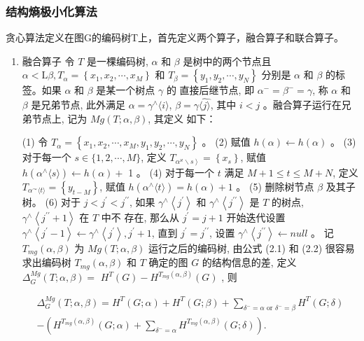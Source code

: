 \documentclass[a4paper]{apa6}
\begin{document}
\subsubsection{结构熵极小化算法}
\label{sec:orgdf1ffb0}
贪心算法定义在图G的编码树T上，首先定义两个算子，融合算子和联合算子。

\begin{enumerate}
\item 融合算子
\label{sec:org3344f46}
令 \(T\) 是一棵编码树, \(\alpha\) 和 \(\beta\) 是树中的两个节点且 \(\alpha<\mathrm{L} \beta, T_{\alpha}=\left\{x_{1}, x_{2}, \cdots, x_{M}\right\}\) 和 \(T_{\beta}=\left\{y_{1}, y_{2}, \cdots, y_{N}\right\}\) 分别是 \(\alpha\) 和 \(\beta\) 的标签。如果 \(\alpha\) 和 \(\beta\) 是某一个树点 \(\gamma\) 的 直接后继节点, 即 \(\alpha^{-}=\beta^{-}=\gamma\), 称 \(\alpha\) 和 \(\beta\) 是兄弟节点, 此外满足 \(\alpha=\gamma^{\wedge}\langle i\rangle\), \(\beta=\gamma \hat{\langle j\rangle}\), 其中 \(i<j\) 。融合算子运行在兄弟节点上, 记为 \(M g(T ; \alpha, \beta)\), 其定义 如下：

(1) 令 \(T_{\alpha}=\left\{x_{1}, x_{2}, \cdots, x_{M}, y_{1}, y_{2}, \cdots, y_{N}\right\}\) 。
(2) 赋值 \(h(\alpha) \leftarrow h(\alpha)\) 。
(3) 对于每一个 \(s \in\{1,2, \cdots, M\}\), 定义 \(T_{\left.\alpha^{\varkappa} \backslash s\right\rangle}=\left\{x_{s}\right\}\), 赋值 \(h\left(\alpha^{\wedge}\langle s\rangle\right) \leftarrow h(\alpha)+\)
1 。
(4) 对于每一个 \(t\) 满足 \(M+1 \leq t \leq M+N\), 定义 \(T_{\alpha^{\curvearrowright}\langle t\rangle}=\left\{y_{t-M}\right\}\), 赋值 \(h\left(\alpha^{\wedge}\langle t\rangle\right)=h(\alpha)+1\) 。
(5) 删除树节点 \(\beta\) 及其子树。
(6) 对于 \(j<j^{\prime}<j^{\prime \prime}\), 如果 \(\gamma^{\wedge}\left\langle j^{\prime}\right\rangle\) 和 \(\gamma^{\wedge}\left\langle j^{\prime \prime}\right\rangle\) 是 \(T\) 的树点, \(\gamma^{\wedge}\left\langle j^{\prime \prime}+1\right\rangle\) 在 \(T\) 中不
存在, 那么从 \(j^{\prime}=j+1\) 开始迭代设置 \(\gamma^{\wedge}\left\langle j^{\prime}-1\right\rangle \leftarrow \gamma^{\wedge}\left\langle j^{\prime}\right\rangle, j^{\prime}+1\), 直到 \(j^{\prime}=j^{\prime \prime}\), 设置 \(\gamma^{\wedge}\left\langle j^{\prime \prime}\right\rangle \leftarrow n u l l\) 。
记 \(T_{m g}(\alpha, \beta)\) 为 \(M g(T ; \alpha, \beta)\) 运行之后的编码树, 由公式 (2.1) 和 (2.2) 很容易 求出编码树 \(T_{m g}(\alpha, \beta)\) 和 \(T\) 确定的图 \(G\) 的结构信息的差, 定义 \(\Delta_{G}^{M g}(T ; \alpha, \beta)=\) \(H^{T}(G)-H^{T_{m g}(\alpha, \beta)}(G)\) , 则

$$\begin{array}{r}
\Delta_{G}^{M g}(T ; \alpha, \beta)=H^{T}(G ; \alpha)+H^{T}(G ; \beta)+\sum_{\delta^{-}=\alpha \text { or } \delta^{-}=\beta} H^{T}(G ; \delta) \\
-\left(H^{T_{m g}(\alpha, \beta)}(G ; \alpha)+\sum_{\delta^{-}=\alpha} H^{T_{m g}(\alpha, \beta)}(G ; \delta)\right) .
\end{array}$$


\end{enumerate}
\end{document}
